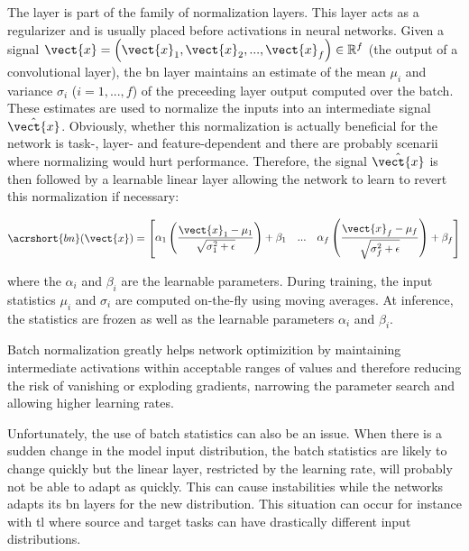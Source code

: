 The  \parencite{ioffe2015batch} layer is part of the family of
normalization layers. This layer acts as a regularizer and is usually placed before
activations in neural networks. Given a signal
$\vect{x} = \left(\vect{x}_1, \vect{x}_2, ..., \vect{x}_f\right) \in \mathbb{R}^f$
(\eg the output of a convolutional layer), the \acrshort{bn} layer maintains an
estimate of the mean $\mu_i$ and variance $\sigma_i$ ($i = 1, ..., f$) of the
preceeding layer output computed over the batch. These estimates are used to
normalize the inputs into an intermediate signal $\hat{\vect{x}}$. Obviously,
whether this normalization is actually beneficial for the network is task-, layer-
and feature-dependent and there are probably scenarii where normalizing would hurt
performance. Therefore, the signal $\hat{\vect{x}}$ is then followed by a learnable
linear layer allowing the network to learn to revert this normalization if
necessary:

\begin{equation}
\label{eqn:backml:bn}
\acrshort{bn}(\vect{x}) = \begin{bmatrix}
\alpha_1 \left(\dfrac{\vect{x}_1 - \mu_1}{\sqrt{\sigma^2_1 + \epsilon}}\right) + \beta_1 & ... & \alpha_f \left(\dfrac{\vect{x}_f - \mu_f}{\sqrt{\sigma^2_f + \epsilon}}\right) + \beta_f \\
\end{bmatrix}\end{equation}

where the $\alpha_i$ and $\beta_i$ are the learnable parameters. During training,
the input statistics $\mu_i$ and $\sigma_i$ are computed on-the-fly using moving
averages. At inference, the statistics are frozen as well as the learnable parameters
$\alpha_i$ and $\beta_i$.

Batch normalization greatly helps network optimizition by maintaining intermediate
activations within acceptable ranges of values and therefore reducing the risk of
vanishing or exploding gradients, narrowing the parameter search and allowing
higher learning rates.

Unfortunately, the use of batch statistics can also be an issue. When there is a
sudden change in the model input distribution, the batch statistics are likely to
change quickly but the linear layer, restricted by the learning rate, will probably
not be able to adapt as quickly. This can cause instabilities while the networks
adapts its \acrlong{bn} layers for the new distribution. This situation can occur
for instance with \acrlong{tl} where source and target tasks can have drastically
different input distributions.

